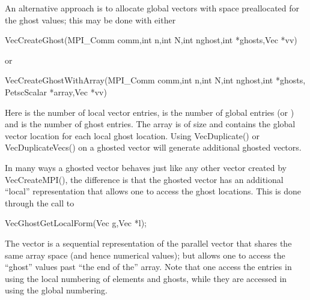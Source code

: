 An alternative approach is to allocate global vectors with space preallocated for 
the ghost values; this may be done with either 
\begin{tabbing}
  VecCreateGhost(MPI\_Comm comm,int n,int N,int nghost,int *ghosts,Vec *vv)
\end{tabbing}
or
\begin{tabbing}
  VecCreateGhostWithArray(MPI\_Comm comm,int n,int N,int nghost,int *ghosts,\\
                                  PetscScalar *array,Vec *vv)
\end{tabbing}
Here    is the 
number of local vector entries,  is the number of 
global entries (or ) and  is the number of 
ghost entries. The array  is of size  and contains the 
global vector location for each local ghost location. Using VecDuplicate()
or VecDuplicateVecs() on a ghosted vector will generate additional ghosted vectors.

In many ways a ghosted vector behaves just like any other  vector created 
by VecCreateMPI(), the difference is that the ghosted vector has an additional 
``local'' representation that allows one to access the ghost locations. This is done
through the call to  
\begin{tabbing}
 VecGhostGetLocalForm(Vec g,Vec *l);
\end{tabbing}
The vector  is a 
sequential representation of the parallel vector  
that shares the same array space (and hence numerical values); but allows one to 
access the ``ghost'' values past ``the end of the'' array. Note that one access the 
entries in  using the local numbering of elements and ghosts, while they 
are accessed in  using the global numbering.

